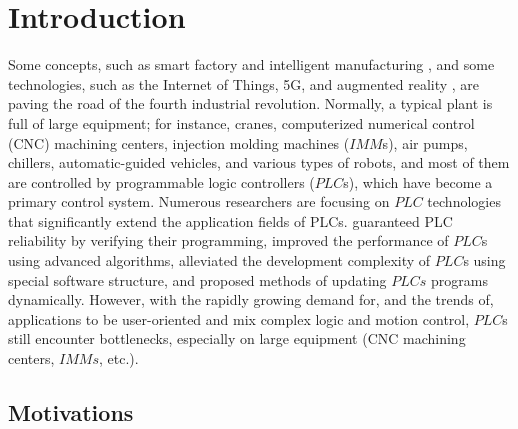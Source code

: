 \documentclass[journal,UTF8]{IEEEtran}
\begin{document}
	\IEEEpeerreviewmaketitle
	
	
	
	\section{Introduction}
	Some concepts, such as smart factory and intelligent manufacturing \cite{Chekired2018Industrial,cheng2018industrial}, and some technologies, such as the Internet of Things, 5G, and augmented reality \textcolor{red}{\cite{da2014internet,Liu2016Traversing,Li20185G}}, are paving the road of the fourth industrial revolution. Normally, a typical plant is full of large equipment; for instance, cranes, computerized numerical control (CNC) machining centers, injection molding machines ($IMM$s), air pumps, chillers, automatic-guided vehicles, and various types of robots, and most of them are controlled by programmable logic controllers ($PLC$s), which have become a primary control system. Numerous researchers are focusing on $PLC$ technologies that significantly extend the application fields of PLCs. \cite{Jiang2013System,Jiang2013Bayesian,Adiego2015Applying} guaranteed PLC reliability by verifying their programming, \cite{Gerk2006Advanced,Chang2007Adaptive,Dominic2016PLC} improved the performance of $PLC$s using advanced algorithms, \cite{wu2018customized} alleviated the development complexity of $PLC$s using special software structure, and \cite{Sch2013Development,Morenas2017Shop} proposed methods of updating $PLCs$ programs dynamically.
	However, with the rapidly growing demand for, and the trends of, applications to be user-oriented and mix complex logic and motion control\cite{Zaeh2005A,Hossain2014Advanced}, $PLC$s still encounter bottlenecks, especially on large equipment (CNC machining centers, $IMMs$, etc.).
	
	\subsection{Motivations}
	
\end{document}
